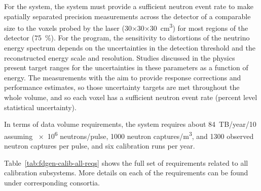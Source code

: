 For the  system, the system must provide a sufficient neutron event rate to make spatially separated precision measurements across the detector of a comparable size to the voxels probed by the laser (\num{30}$\times$\num{30}$\times$\SI{30}{\cubic\cm}) for most regions of the detector (\SI{75}{\%}). 
For the  program, the sensitivity to distortions of the neutrino energy spectrum depends on the uncertainties in the detection threshold and the reconstructed energy scale and resolution. Studies discussed in the physics  present target ranges for the uncertainties in these parameters as a function of energy. The measurements with the  aim to provide response corrections and performance estimates, so those uncertainty targets are met throughout the whole volume, and so each voxel has a sufficient neutron event rate (percent level statistical uncertainty).



In terms of data volume requirements, the  system requires about \num{84}~TB/year/\SI{10}{\kt} assuming \num{e6} neutrons/pulse, \num{1000} neutron captures/\si{\cubic\m},
and \num{1300} observed neutron captures per pulse, and six calibration runs per year. 



Table~\ref{tab:fdgen-calib-all-reqs} shows the full set of requirements related to all calibration subsystems. More details on each of the requirements can be found under corresponding consortia.   



%



